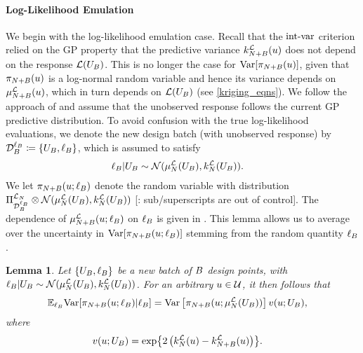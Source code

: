 \documentclass[12pt]{article}
\newtheorem{lemma}{Lemma}
\begin{document}
\paragraph{Log-Likelihood Emulation}
We begin with the log-likelihood emulation case. Recall that the 
$\intvarLabel$ criterion relied on the GP property that the predictive variance $\emKer[\Naugment]{\llik}(\Par)$
does not depend on the response $\llik(\designBatchIn)$. This is no longer the case for 
$\Var[\llikEmRdmDens[\Naugment](\Par)]$, given that $\llikEmRdmDens[\Naugment](\Par)$ is a log-normal 
random variable and hence its variance depends on $\emMean[\Naugment]{\llik}(\Par)$,  
which in turn depends on $\llik(\designBatchIn)$ (see \ref{kriging_eqns}). 
We follow the approach of \cite{VehtariParallelGP} and assume that the unobserved response follows the 
current GP predictive distribution. To avoid confusion with the true log-likelihood evaluations, we denote the 
new design batch (with unobserved response) by 
$\designRand{\designBatchLlik} \Def \{\designBatchIn, \designBatchLlik\}$, which is assumed 
to satisfy 
\begin{align}
\designBatchLlik | \designBatchIn &\sim \Gaussian(\emMean[\Ndesign]{\llik}(\designBatchIn), \emKer[\Ndesign]{\llik}(\designBatchIn)).
\end{align}
We let $\llikEmRdmDens[\Naugment](\Par; \designBatchLlik)$ denote the random variable with distribution 
$\emLaw[{\designRand{\designBatchLlik}}]{\llikEm[\Ndesign]} \otimes \Gaussian(\emMean[\Ndesign]{\llik}(\designBatchIn), \emKer[\Ndesign]{\llik}(\designBatchIn))$
[\todo: sub/superscripts are out of control]. 
The dependence of $\emMean[\Naugment]{\llik}(\Par; \designBatchLlik)$ on $\designBatchLlik$ is given in 
. This lemma allows us to average over the uncertainty in  
$\Var[\llikEmRdmDens[\Naugment](\Par; \designBatchLlik)]$ stemming from the random quantity $\designBatchLlik$. 
\begin{lemma} \label{lemma:evar}
Let $\{\designBatchIn, \designBatchLlik\}$ be a new batch of $\Nbatch$ design points, with 
$\designBatchLlik | \designBatchIn \sim \Gaussian(\emMean[\Ndesign]{\llik}(\designBatchIn), \emKer[\Ndesign]{\llik}(\designBatchIn))$. 
For an arbitrary $\Par \in \parSpace$, it then follows that 
\begin{align}
\E_{\designBatchLlik} \Var[\llikEmRdmDens[\Naugment](\Par; \designBatchLlik) | \designBatchLlik]
&= \Var\left[\llikEmRdmDens[\Naugment](\Par; \emMean[\Ndesign]{\llik}(\designBatchIn))\right]
	\varInflation(\Par; \designBatchIn), \label{evar-expression}
\end{align}
where 
\begin{align}
\varInflation(\Par; \designBatchIn)
&= \Exp{2\left(\emKer[\Ndesign]{\llik}(\Par) - \emKer[\Naugment]{\llik}(\Par)\right)}. \label{var_inflation_factor}
\end{align}
\end{lemma}
\end{document}
